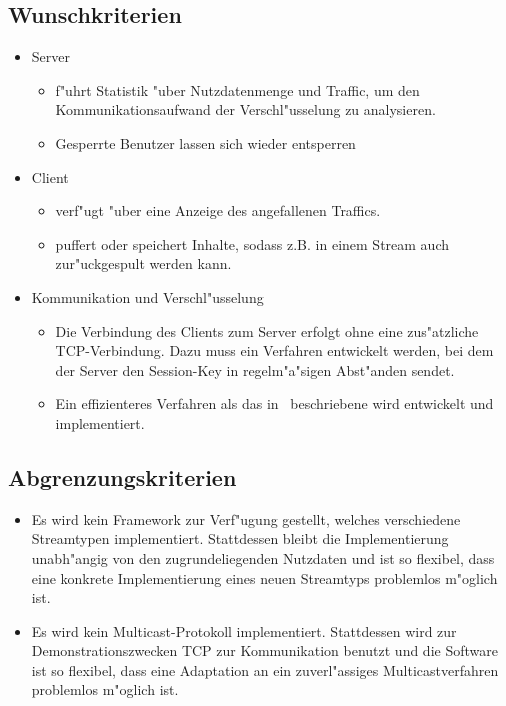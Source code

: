 \documentclass[a4paper,10pt]{scrartcl}
\begin{document}
\subsection{Wunschkriterien}

\begin{itemize}

\item Server
\begin{itemize}
   \item f"uhrt Statistik "uber Nutzdatenmenge und Traffic, um den Kommunikationsaufwand
         der Verschl"usselung zu analysieren.
   \item Gesperrte Benutzer lassen sich wieder entsperren
\end{itemize}

\item Client
\begin{itemize}
   \item verf"ugt "uber eine Anzeige des angefallenen Traffics.
   \item puffert oder speichert Inhalte, sodass z.B. in einem Stream auch
         zur"uckgespult werden kann.
\end{itemize}

\item Kommunikation und Verschl"usselung
\begin{itemize}
   \item Die Verbindung des Clients zum Server erfolgt ohne eine zus"atzliche TCP-Verbindung.
         Dazu muss ein Verfahren entwickelt werden, bei dem der Server den Session-Key
         in regelm"a"sigen Abst"anden sendet.
   \item Ein effizienteres Verfahren als das in~\cite{Naor00} beschriebene wird
         entwickelt und implementiert.
\end{itemize}
\end{itemize}

\subsection{Abgrenzungskriterien}
\begin{itemize}
   \item Es wird kein Framework zur Verf"ugung gestellt, welches verschiedene
         Streamtypen implementiert. Stattdessen bleibt die Implementierung
         unabh"angig von den zugrundeliegenden Nutzdaten und ist so flexibel,
         dass eine konkrete Implementierung eines neuen Streamtyps problemlos
         m"oglich ist.
   \item Es wird kein Multicast-Protokoll implementiert. Stattdessen wird
         zur Demonstrationszwecken TCP zur Kommunikation benutzt und die Software
         ist so flexibel, dass eine Adaptation an ein zuverl"assiges
         Multicastverfahren problemlos m"oglich ist.
\end{itemize}
\end{document}
